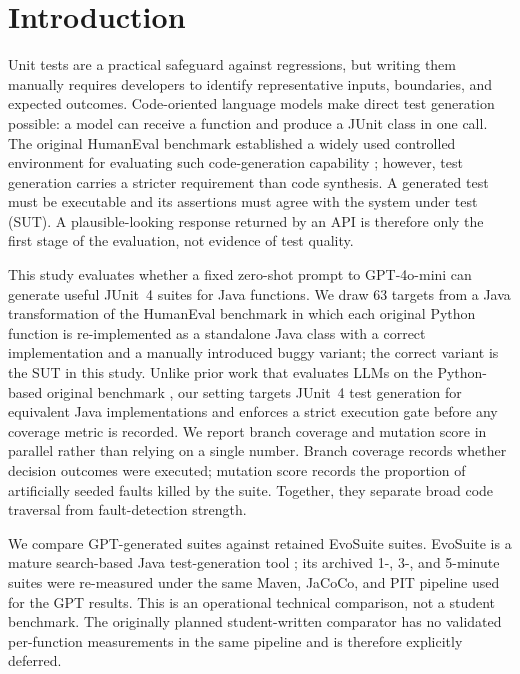 \section{Introduction}
\label{sec:intro}

Unit tests are a practical safeguard against regressions, but writing them manually requires developers to identify representative inputs, boundaries, and expected outcomes. Code-oriented language models make direct test generation possible: a model can receive a function and produce a JUnit class in one call. The original HumanEval benchmark established a widely used controlled environment for evaluating such code-generation capability \cite{chen2021codex}; however, test generation carries a stricter requirement than code synthesis. A generated test must be executable and its assertions must agree with the system under test (SUT). A plausible-looking response returned by an API is therefore only the first stage of the evaluation, not evidence of test quality.

This study evaluates whether a fixed zero-shot prompt to GPT-4o-mini can generate useful JUnit~4 suites for Java functions. We draw 63 targets from a Java transformation of the HumanEval benchmark in which each original Python function is re-implemented as a standalone Java class with a correct implementation and a manually introduced buggy variant; the correct variant is the SUT in this study. Unlike prior work that evaluates LLMs on the Python-based original benchmark \cite{yuan2024junit}, our setting targets JUnit~4 test generation for equivalent Java implementations and enforces a strict execution gate before any coverage metric is recorded. We report branch coverage and mutation score in parallel rather than relying on a single number. Branch coverage records whether decision outcomes were executed; mutation score records the proportion of artificially seeded faults killed by the suite. Together, they separate broad code traversal from fault-detection strength.

We compare GPT-generated suites against retained EvoSuite suites. EvoSuite is a mature search-based Java test-generation tool \cite{Tang_2024}; its archived 1-, 3-, and 5-minute suites were re-measured under the same Maven, JaCoCo, and PIT pipeline used for the GPT results. This is an operational technical comparison, not a student benchmark. The originally planned student-written comparator has no validated per-function measurements in the same pipeline and is therefore explicitly deferred.

